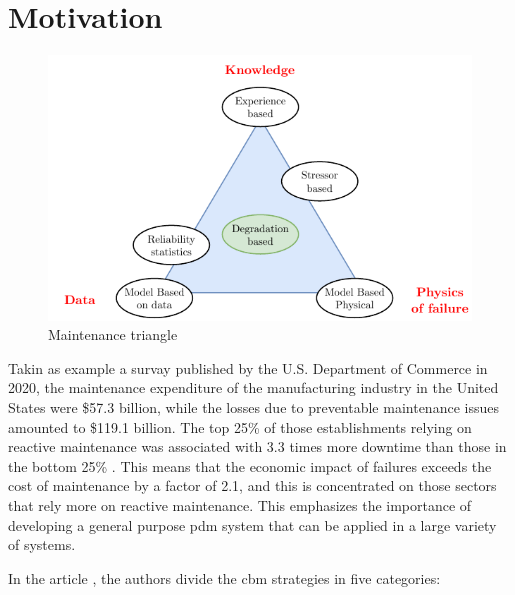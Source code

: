 \section{Motivation}
\label{sec:motivation}

\begin{figure}
    \centering
    \includegraphics[scale=1.3]{images/Intro/MaintTriangle.pdf}
    \caption{Maintenance triangle}
    \label{fig:MaintTriangle}
\end{figure} 

Takin as example a survay published by the U.S. Department of Commerce in 2020, the maintenance expenditure of the manufacturing industry in the United States were \$57.3 billion, while the losses due to preventable maintenance issues amounted to \$119.1 billion. The top 25\% of those 
establishments relying on reactive maintenance was associated with 3.3 times more downtime 
than those in the bottom 25\% \cite{NIST}. This means that the economic impact of failures exceeds the cost of maintenance by a factor of 2.1, and this is concentrated on those sectors that rely more on reactive maintenance. This emphasizes the importance of developing a general purpose \gls{pdm} system that can be applied in a large variety of systems.

In the article \cite{Maintenance_cat}, the authors divide the \gls{cbm} strategies in five categories:

